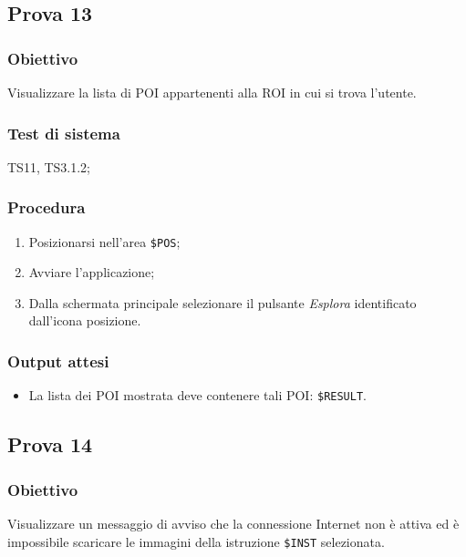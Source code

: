 \documentclass[../SperimentazioniPratiche.tex]{subfiles}
\begin{document}
	
\newpage	
\subsection{Prova 13} %
\label{subsec:Prova13}
	
	\subsubsection{Obiettivo}
		Visualizzare la lista di POI appartenenti alla ROI in cui si trova l'utente.
		
	\subsubsection{Test di sistema}
		TS11,
		TS3.1.2;
		
	\subsubsection{Procedura}
		\begin{enumerate}
		\item Posizionarsi nell'area \verb|$POS|;
		\item Avviare l'applicazione;
		\item Dalla schermata principale selezionare il pulsante \textit{Esplora} identificato dall'icona posizione. 
		\end{enumerate}
		
	\subsubsection{Output attesi}
		\begin{itemize}
		\item La lista dei POI mostrata deve contenere tali POI: \verb|$RESULT|.
		\end{itemize}
		
	
		
\newpage	
\subsection{Prova 14} %
\label{subsec:Prova14}
	
	\subsubsection{Obiettivo}
		Visualizzare un messaggio di avviso che la connessione Internet non è attiva ed è impossibile scaricare le immagini della istruzione  \verb|$INST| selezionata.
		
\end{document}
